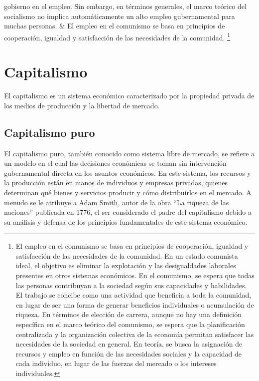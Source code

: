 \documentclass[
  letterpaper,
  DIV=11,
  numbers=noendperiod]{scrartcl}
\begin{document}
\begin{longtable}[]
{  gobierno en el empleo. Sin embargo, en términos generales, el marco
  teórico del socialismo no implica automáticamente un alto empleo
  gubernamental para muchas personas.} & El empleo en el comunismo se
basa en principios de cooperación, igualdad y satisfacción de las
necesidades de la comunidad. \footnote{El empleo en el comunismo se basa
  en principios de cooperación, igualdad y satisfacción de las
  necesidades de la comunidad. En un estado comunista ideal, el objetivo
  es eliminar la explotación y las desigualdades laborales presentes en
  otros sistemas económicos. En el comunismo, se espera que todas las
  personas contribuyan a la sociedad según sus capacidades y
  habilidades. El trabajo se concibe como una actividad que beneficia a
  toda la comunidad, en lugar de ser una forma de generar beneficios
  individuales o acumulación de riqueza. En términos de elección de
  carrera, aunque no hay una definición específica en el marco teórico
  del comunismo, se espera que la planificación centralizada y la
  organización colectiva de la economía permitan satisfacer las
  necesidades de la sociedad en general. En teoría, se busca la
  asignación de recursos y empleo en función de las necesidades sociales
  y la capacidad de cada individuo, en lugar de las fuerzas del mercado
  o los intereses individuales.} \\
\end{longtable}

\hypertarget{capitalismo}{%
\section{Capitalismo}\label{capitalismo}}

El capitalismo es un sistema económico caracterizado por la propiedad
privada de los medios de producción y la libertad de mercado.

\hypertarget{capitalismo-puro}{%
\subsection{Capitalismo puro}\label{capitalismo-puro}}

El capitalismo puro, también conocido como sistema libre de mercado, se
refiere a un modelo en el cual las decisiones económicas se toman sin
intervención gubernamental directa en los asuntos económicos. En este
sistema, los recursos y la producción están en manos de individuos y
empresas privadas, quienes determinan qué bienes y servicios producir y
cómo distribuirlos en el mercado. A menudo se le atribuye a Adam Smith,
autor de la obra ``La riqueza de las naciones'' publicada en 1776, el
ser considerado el padre del capitalismo debido a su análisis y defensa
de los principios fundamentales de este sistema económico.
\end{document}
